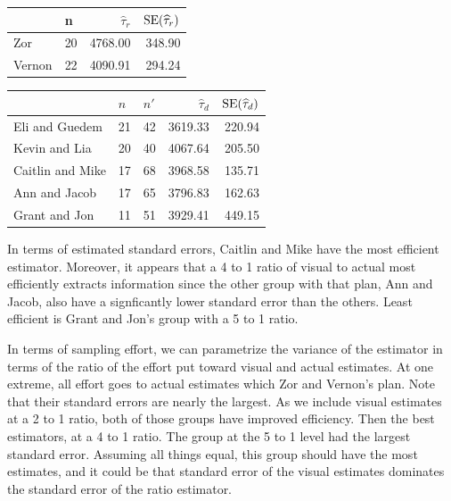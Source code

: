 \documentclass[usenames,dvipsnames]{homework}
\begin{document}
\begin{longproblem}
\begin{solution}
\begin{center}
\renewcommand{\arraystretch}{1.6}
\begin{tabular}{l|l r r }
       &  n   &$\hat\tau_r$&$\mathrm{SE}(\widehat\tau_r)$ \\\hline
Zor    & 20   &  4768.00 & 348.90 \\
Vernon & 22   &  4090.91 & 294.24 \\
\end{tabular}
\begin{tabular}{l|l l r r}
		 & $n$& $n'$&$\hat\tau_{d} $&$\mathrm{SE}(\widehat\tau_d)$ \\\hline
Eli and Guedem   & 21 & 42  &  3619.33   &   220.94 \\ 
Kevin and Lia    & 20 & 40  &  4067.64   &   205.50 \\
Caitlin and Mike & 17 & 68  &  3968.58   &   135.71 \\
Ann and Jacob    & 17 & 65  &  3796.83   &   162.63 \\
Grant and Jon    & 11 & 51  &  3929.41   &   449.15 \\\hline
\end{tabular}
\end{center}
\end{solution}

\begin{solution}
  In terms of estimated standard errors, Caitlin and Mike have the most
  efficient estimator. Moreover, it appears that a 4 to 1 ratio of visual to
  actual most efficiently extracts information since the other group with that
  plan, Ann and Jacob, also have a signficantly lower standard error than the
  others. Least efficient is Grant and Jon's group with a 5 to 1 ratio. 

  In terms of sampling effort, we can parametrize the variance of the estimator
  in terms of the ratio of the effort put toward visual and actual estimates.
  At one extreme, all effort goes to actual estimates which Zor and Vernon's plan.
  Note that their standard errors are nearly the largest.  As we include
  visual estimates at a 2 to 1 ratio, both of those groups have improved
  efficiency. Then the best estimators, at a 4 to 1 ratio. The group at the 5
  to 1 level had the largest standard error. Assuming all things equal,
  this group should have the most estimates, and it could be that standard
  error of the visual estimates dominates the standard error of the ratio estimator.


\end{solution}
\end{longproblem}
\end{document}
